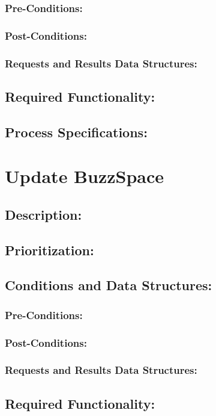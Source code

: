 \documentclass[a4paper,11pt]{article}
\begin{document}
\subsubsection*{Pre-Conditions:}
\subsubsection*{Post-Conditions:}
\subsubsection*{Requests and Results Data Structures:}
\subsection{Required Functionality:} 
\subsection{Process Specifications:} 

\section{Update BuzzSpace}
\subsection*{Description:}
\subsection{Prioritization:} 
\subsection{Conditions and Data Structures:}
\subsubsection*{Pre-Conditions:}
\subsubsection*{Post-Conditions:}
\subsubsection*{Requests and Results Data Structures:}
\subsection{Required Functionality:} 
\end{document}

